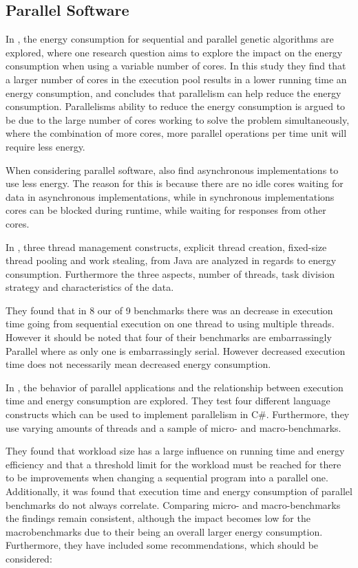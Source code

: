 \subsection{Parallel Software}

In \cite{abdelhafez2019}, the energy consumption for sequential and parallel genetic algorithms are explored, where one research question aims to explore the impact on the energy consumption when using a variable number of cores. In this study they find that a larger number of cores in the execution pool results in a lower running time an energy consumption, and concludes that parallelism can help reduce the energy consumption. Parallelisms ability to reduce the energy consumption is argued to be due to the large number of cores working to solve the problem simultaneously, where the combination of more cores, more parallel operations per time unit will require less energy.

When considering parallel software, \cite{abdelhafez2019} also find asynchronous implementations to use less energy. The reason for this is because there are no idle cores waiting for data in asynchronous implementations, while in synchronous implementations cores can be blocked during runtime, while waiting for responses from other cores. 


In \cite{Pinto2014}, three thread management constructs, explicit thread creation, fixed-size thread pooling and work stealing, from Java are analyzed in regards to energy consumption. Furthermore the three aspects, number of threads, task division strategy and characteristics of the data. 

They found that in 8 our of 9 benchmarks there was an decrease in execution time going from sequential execution on one thread to using multiple threads. However it should be noted that four of their benchmarks are embarrassingly Parallel where as only one is embarrassingly serial. However decreased execution time does not necessarily mean decreased energy consumption.



In \cite{Lindholt}, the behavior of parallel applications and the relationship between execution time and energy consumption are explored. They test four different language constructs which can be used to implement parallelism in C\#. Furthermore, they use varying amounts of threads and a sample of micro- and macro-benchmarks. \cite{Lindholt}

They found that workload size has a large influence on running time and energy efficiency and that a threshold limit for the workload must be reached for there to be improvements when changing a sequential program into a parallel one.  Additionally, it was found that execution time and energy consumption of parallel benchmarks do not always correlate.  Comparing micro- and macro-benchmarks the findings remain consistent, although the impact becomes low for the macrobenchmarks due to their being an overall larger energy consumption. Furthermore, they have included some recommendations, which should be considered:\cite{Lindholt}

